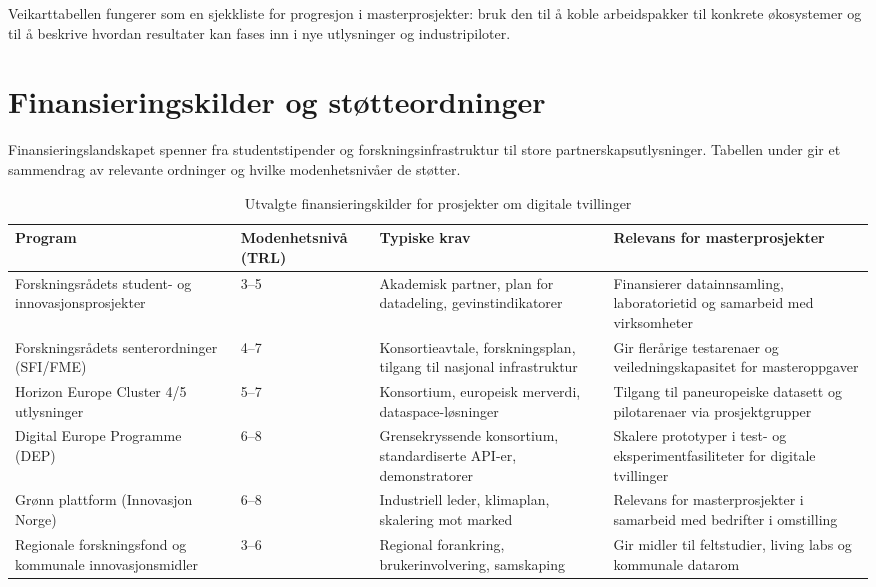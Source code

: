 Veikarttabellen fungerer som en sjekkliste for progresjon i masterprosjekter: bruk den til å koble arbeidspakker til konkrete økosystemer og til å beskrive hvordan resultater kan fases inn i nye utlysninger og industripiloter.

\section{Finansieringskilder og støtteordninger}
Finansieringslandskapet spenner fra studentstipender og forskningsinfrastruktur til store partnerskapsutlysninger. Tabellen under gir et sammendrag av relevante ordninger og hvilke modenhetsnivåer de støtter.

\begin{table}[h]
    \centering
    \caption{Utvalgte finansieringskilder for prosjekter om digitale tvillinger}
    \label{tab:finansiering}
    \begin{tabular}{p{3.0cm}p{2.4cm}p{4.3cm}p{3.5cm}}
        \toprule
        Program & Modenhetsnivå (TRL) & Typiske krav & Relevans for masterprosjekter \\
        \midrule
        Forskningsrådets student- og innovasjonsprosjekter & 3--5 & Akademisk partner, plan for datadeling, gevinstindikatorer & Finansierer datainnsamling, laboratorietid og samarbeid med virksomheter \\
        Forskningsrådets senterordninger (SFI/FME) & 4--7 & Konsortieavtale, forskningsplan, tilgang til nasjonal infrastruktur & Gir flerårige testarenaer og veiledningskapasitet for masteroppgaver \\
        Horizon Europe Cluster 4/5 utlysninger & 5--7 & Konsortium, europeisk merverdi, dataspace-løsninger & Tilgang til paneuropeiske datasett og pilotarenaer via prosjektgrupper \\
        Digital Europe Programme (DEP) & 6--8 & Grensekryssende konsortium, standardiserte API-er, demonstratorer & Skalere prototyper i test- og eksperimentfasiliteter for digitale tvillinger \\
        Grønn plattform (Innovasjon Norge) & 6--8 & Industriell leder, klimaplan, skalering mot marked & Relevans for masterprosjekter i samarbeid med bedrifter i omstilling \\
        Regionale forskningsfond og kommunale innovasjonsmidler & 3--6 & Regional forankring, brukerinvolvering, samskaping & Gir midler til feltstudier, living labs og kommunale datarom \\
        \bottomrule
    \end{tabular}
\end{table}


